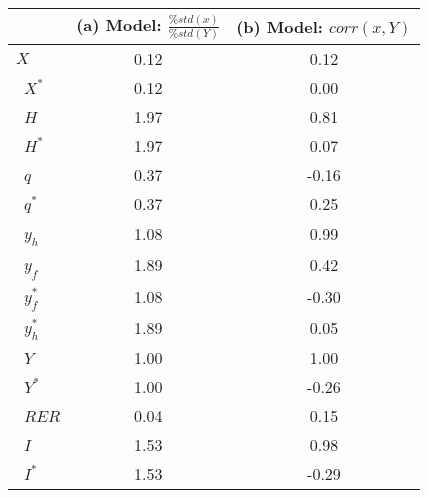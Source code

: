 \begin{small}\begin{tabular}{lcc}
\hline
&(a) Model: $\frac{\% std(x)}{\% std(Y)}$&(b) Model: $corr(x,Y)$\\\hline
$X$ &0.12&0.12\\\
$X^{\ast}$ &0.12&0.00\\\
$H$ &1.97&0.81\\\
$H^{\ast}$ &1.97&0.07\\\
$q$ &0.37&-0.16\\\
$q^{\ast}$ &0.37&0.25\\\
$y_{h}$ &1.08&0.99\\\
$y_{f}$ &1.89&0.42\\\
$y_{f}^{\ast}$ &1.08&-0.30\\\
$y_{h}^{\ast}$ &1.89&0.05\\\
$Y$ &1.00&1.00\\\
$Y^{\ast}$ &1.00&-0.26\\\
$RER$ &0.04&0.15\\\
$I$ &1.53&0.98\\\
$I^{\ast}$ &1.53&-0.29\\\hline
\end{tabular}
\end{small}